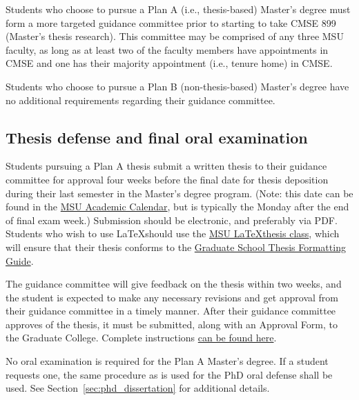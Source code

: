 Students who choose to pursue a Plan A (i.e., thesis-based) Master's
degree must form a more targeted guidance committee prior to starting
to take CMSE 899 (Master's thesis research).  This committee may be
comprised of any three MSU faculty, as long as at least two of the
faculty members have appointments in CMSE and one has their majority
appointment (i.e., tenure home) in CMSE.

Students who choose to pursue a Plan B (non-thesis-based) Master's
degree have no additional requirements regarding their guidance
committee.

\subsection{Thesis defense and final oral examination}

Students pursuing a Plan A thesis submit a written thesis to their
guidance committee for approval four weeks before the final date for
thesis deposition during their last semester in the Master's degree
program.  (Note: this date can be found in the
\href{https://reg.msu.edu/ROInfo/Calendar/Academic.aspx}{MSU Academic
Calendar}, but is typically the Monday after the end of final exam
week.)  Submission should be electronic, and preferably via PDF.
Students who wish to use \LaTeX should use the
\href{http://ctan.org/pkg/msu-thesis}{MSU \LaTeX thesis class}, which
will ensure that their thesis conforms to the
\href{https://grad.msu.edu/etd/formatting-guide}{Graduate School
Thesis Formatting Guide}.

The guidance committee will give feedback on the thesis within two
weeks, and the student is expected to make any necessary revisions and
get approval from their guidance committee in a timely manner.  After
their guidance committee approves of the thesis, it must be submitted,
along with an Approval Form, to the Graduate College.  Complete
instructions \href{https://grad.msu.edu/etd}{can be found here}.

No oral examination is required for the Plan A Master's degree.  If a
student requests one, the same procedure as is used for the PhD oral
defense shall be used.  See Section~\ref{sec:phd_dissertation} for
additional details.